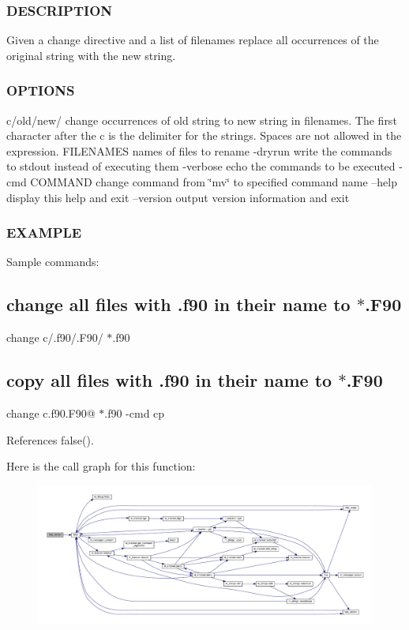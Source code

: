 \subsubsection*{D\+E\+S\+C\+R\+I\+P\+T\+I\+ON}

Given a change directive and a list of filenames replace all occurrences of the original string with the new string.

\subsubsection*{O\+P\+T\+I\+O\+NS}

c/old/new/ change occurrences of old string to new string in filenames. The first character after the c is the delimiter for the strings. Spaces are not allowed in the expression. F\+I\+L\+E\+N\+A\+M\+ES names of files to rename -\/dryrun write the commands to stdout instead of executing them -\/verbose echo the commands to be executed -\/cmd C\+O\+M\+M\+A\+ND change command from \char`\"{}mv\char`\"{} to specified command name --help display this help and exit --version output version information and exit

\subsubsection*{E\+X\+A\+M\+P\+LE}

Sample commands\+:

\subsection*{change all files with .f90 in their name to $\ast$.F90}

change c/.f90/.F90/ $\ast$.f90 \subsection*{copy all files with .f90 in their name to $\ast$.F90}

change c.f90.F90@ $\ast$.f90 -\/cmd cp 

References false().

Here is the call graph for this function\+:
\nopagebreak
\begin{figure}[H]
\begin{center}
\leavevmode
\includegraphics[width=350pt]{change_8f90_a39c21619b08a3c22f19e2306efd7f766_cgraph}
\end{center}
\end{figure}
